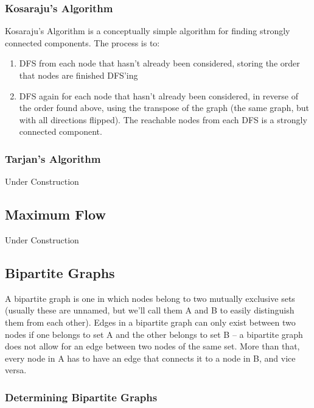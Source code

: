 \subsubsection{Kosaraju's Algorithm}

Kosaraju's Algorithm is a conceptually simple algorithm for finding strongly connected components. The process is to:
\begin{enumerate}
\item DFS from each node that hasn't already been considered, storing the order that nodes are finished DFS'ing
\item DFS again for each node that hasn't already been considered, in reverse of the order found above, using the transpose of the graph (the same graph, but with all directions flipped). The reachable nodes from each DFS is a strongly connected component.
\end{enumerate}


\subsubsection{Tarjan's Algorithm}

Under Construction

\subsection{Maximum Flow}
   

Under Construction

\subsection{Bipartite Graphs}

A bipartite graph is one in which nodes belong to two mutually exclusive sets (usually these are unnamed, but we'll call them A and B to easily distinguish them from each other). Edges in a bipartite graph can only exist between two nodes if one belongs to set A and the other belongs to set B -- a bipartite graph does not allow for an edge between two nodes of the same set. More than that, every node in A has to have an edge that connects it to a node in B, and vice versa.

\subsubsection{Determining Bipartite Graphs}

